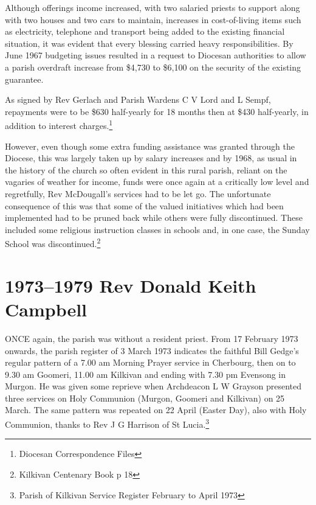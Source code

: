 Although offerings income increased, with two salaried priests to support along with two houses and two cars to maintain, increases in cost-of-living items such as electricity, telephone and transport being added to the existing financial situation, it was evident that every blessing carried heavy responsibilities. By June 1967 budgeting issues resulted in a request to Diocesan authorities to allow a parish overdraft increase from \$4,730 to \$6,100 on the security of the existing guarantee.



As signed by Rev Gerlach and Parish Wardens C V Lord and L Sempf, repayments were to be \$630 half-yearly for 18 months then at \$430 half-yearly, in addition to interest charges.\footnote{Diocesan Correspondence Files}


However, even though some extra funding assistance was granted through the Diocese, this was largely taken up by salary increases and by 1968, as usual in the history of the church so often evident in this rural parish, reliant on the vagaries of weather for income, funds were once again at a critically low level and regretfully, Rev McDougall's services had to be let go. The unfortunate consequence of this was that some of the valued initiatives which had been implemented had to be pruned back while others were fully discontinued. These included some religious instruction classes in schools and, in one case, the Sunday School was discontinued.\footnote{Kilkivan Centenary Book p 18}
\balance


\printendnotes[custom]
\setcounter{endnote}{0}
\chapter{1973--1979 Rev Donald Keith Campbell}
\nobalance


\lettrine[lines=3]{O}{NCE}
 again, the parish was without a resident priest. From 17 February 1973 onwards, the parish register of 3 March 1973 indicates the faithful Bill Gedge's regular pattern of a 7.00 am Morning Prayer service in Cherbourg, then on to 9.30 am Goomeri, 11.00 am Kilkivan and ending with 7.30 pm Evensong in Murgon. He was given some reprieve when Archdeacon L W Grayson presented three services on Holy Communion (Murgon, Goomeri and Kilkivan) on 25 March. The same pattern was repeated on 22 April (Easter Day), also with Holy Communion, thanks to Rev J G Harrison of St Lucia.\footnote{Parish of Kilkivan Service Register February to April 1973}







